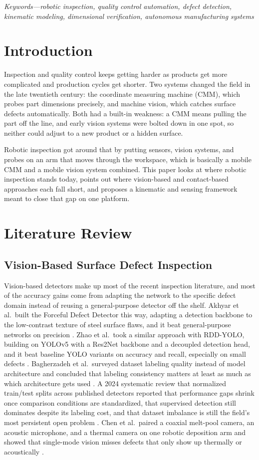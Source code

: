 \documentclass[conference]{IEEEtran}
\begin{document}
\textit{Keywords—robotic inspection, quality control automation, defect detection, kinematic modeling, dimensional verification, autonomous manufacturing systems}

\section{Introduction}
Inspection and quality control keeps getting harder as products get more complicated and production cycles get shorter. Two systems changed the field in the late twentieth century: the coordinate measuring machine (CMM), which probes part dimensions precisely, and machine vision, which catches surface defects automatically. Both had a built-in weakness: a CMM means pulling the part off the line, and early vision systems were bolted down in one spot, so neither could adjust to a new product or a hidden surface.

Robotic inspection got around that by putting sensors, vision systems, and probes on an arm that moves through the workspace, which is basically a mobile CMM and a mobile vision system combined. This paper looks at where robotic inspection stands today, points out where vision-based and contact-based approaches each fall short, and proposes a kinematic and sensing framework meant to close that gap on one platform.

\section{Literature Review}

\subsection{Vision-Based Surface Defect Inspection}
Vision-based detectors make up most of the recent inspection literature, and most of the accuracy gains come from adapting the network to the specific defect domain instead of reusing a general-purpose detector off the shelf. Akhyar et al.\ built the Forceful Defect Detector this way, adapting a detection backbone to the low-contrast texture of steel surface flaws, and it beat general-purpose networks on precision \cite{ref1}. Zhao et al.\ took a similar approach with RDD-YOLO, building on YOLOv5 with a Res2Net backbone and a decoupled detection head, and it beat baseline YOLO variants on accuracy and recall, especially on small defects \cite{ref2}. Bagherzadeh et al.\ surveyed dataset labeling quality instead of model architecture and concluded that labeling consistency matters at least as much as which architecture gets used \cite{ref3}. A 2024 systematic review that normalized train/test splits across published detectors reported that performance gaps shrink once comparison conditions are standardized, that supervised detection still dominates despite its labeling cost, and that dataset imbalance is still the field's most persistent open problem \cite{ref4}. Chen et al.\ paired a coaxial melt-pool camera, an acoustic microphone, and a thermal camera on one robotic deposition arm and showed that single-mode vision misses defects that only show up thermally or acoustically \cite{ref5}.
\end{document}

